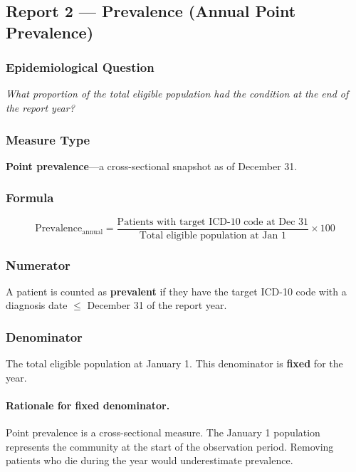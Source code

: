 \documentclass[11pt,a4paper]{article}
\begin{document}
\subsection{Report 2 --- Prevalence (Annual Point Prevalence)}

\subsubsection{Epidemiological Question}
\textit{What proportion of the total eligible population had the condition at the end of the report year?}

\subsubsection{Measure Type}
\textbf{Point prevalence}---a cross-sectional snapshot as of December 31.

\subsubsection{Formula}

\begin{equation}
\text{Prevalence}_{\text{annual}} =
\frac{\text{Patients with target ICD-10 code at Dec 31}}
     {\text{Total eligible population at Jan 1}} \times 100
\end{equation}

\subsubsection{Numerator}

A patient is counted as \textbf{prevalent} if they have the target ICD-10 code with a diagnosis date $\leq$ December 31 of the report year.

\subsubsection{Denominator}

The total eligible population at January 1. This denominator is \textbf{fixed} for the year.

\paragraph{Rationale for fixed denominator.}
Point prevalence is a cross-sectional measure. The January 1 population represents the community at the start of the observation period. Removing patients who die during the year would underestimate prevalence.
\end{document}
